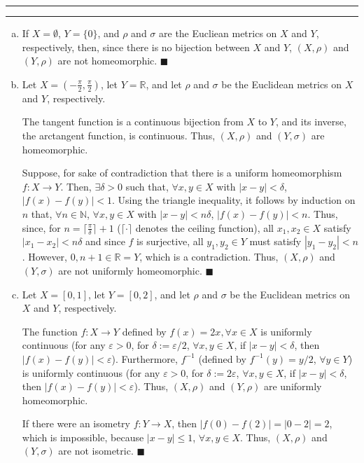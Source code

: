 \documentclass[11pt]{article}
\newcounter{questionCounter}
\newcounter{partCounter}[questionCounter]
\newenvironment{question}[2][\arabic{questionCounter}]{%
    \setcounter{partCounter}{0}%
    \vspace{.25in} \hrule \vspace{0.5em}%
        \noindent{\bf #2}%
    \vspace{0.8em} \hrule \vspace{.10in}%
    \addtocounter{questionCounter}{1}%
}{}
\renewcommand{\qed}{\quad $\blacksquare$}
\newcommand{\inv}{^{-1}}
\newcommand{\N}{\mathbb{N}} %
\newcommand{\R}{\mathbb{R}} %
\newcommand{\e}{\varepsilon} %
\begin{document}
\begin{question}{Problem 6}
\begin{enumerate}[(a)]
\item If $X = \emptyset$, $Y = \{0\}$, and $\rho$ and $\sigma$ are the Eucliean
metrics on $X$ and $Y$, respectively, then, since there is no bijection between
$X$ and $Y$, $(X,\rho)$ and $(Y,\rho)$ are not homeomorphic. \qed

\item Let $X = \left(-\frac{\pi}{2},\frac{\pi}{2}\right)$, let $Y = \R$, and
let $\rho$ and $\sigma$ be the Euclidean metrics on $X$ and $Y$, respectively.

The tangent function is a continuous bijection from $X$ to $Y$,
and its inverse, the arctangent function, is continuous. Thus, $(X,\rho)$ and
$(Y,\sigma)$ are homeomorphic.

Suppose, for sake of contradiction that there is a uniform homeomorphism
$f : X \rightarrow Y$. Then, $\exists \delta > 0$ such that, $\forall
x,y \in X$ with $|x - y| < \delta$, $|f(x) - f(y)| < 1$. Using the triangle
inequality, it follows by induction on $n$ that, $\forall n \in \N$,
$\forall x,y \in X$ with $|x - y| < n\delta$, $|f(x) - f(y)| < n$. Thus,
since, for $n = \lceil \frac{\pi}{\delta} \rceil + 1$ ($\lceil\cdot\rceil$
denotes the ceiling function), all $x_1,x_2 \in X$ satisfy
$|x_1 - x_2| < n\delta$ and since $f$ is surjective, all $y_1,y_2 \in Y$ must
satisfy $|y_1 - y_2| < n$. However, $0, n + 1 \in \R = Y$, which is a
contradiction. Thus, $(X,\rho)$ and $(Y,\sigma)$ are not uniformly
homeomorphic. \qed

\item Let $X = [0,1]$, let $Y = [0,2]$, and let $\rho$ and $\sigma$ be the
Euclidean metrics on $X$ and $Y$, respectively.

The function $f : X \rightarrow Y$ defined by $f(x) = 2x, \forall x \in X$ is
uniformly continuous (for any $\e > 0$, for $\delta := \e/2$,
$\forall x,y \in X$, if $|x - y| < \delta$, then $|f(x) - f(y)| < \e$).
Furthermore, $f\inv$ (defined by $f\inv(y) = y/2$, $\forall y \in Y$) is
uniformly continuous (for any $\e > 0$, for $\delta := 2\e$,
$\forall x,y \in X$, if $|x - y| < \delta$, then $|f(x) - f(y)| < \e$). Thus,
$(X,\rho)$ and $(Y,\rho)$ are uniformly homeomorphic.

If there were an isometry $f: Y \rightarrow X$, then
$|f(0) - f(2)| = |0 - 2| = 2$, which is impossible, because $|x - y| \leq 1$,
$\forall x,y \in X$. Thus, $(X,\rho)$ and $(Y,\sigma)$ are not isometric. \qed
\end{enumerate}
\end{question}
\end{document}
